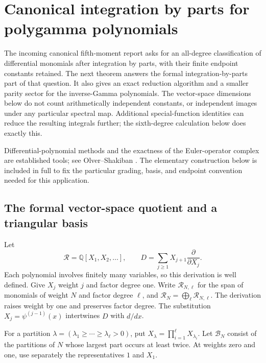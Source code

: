
\section{Canonical integration by parts for polygamma polynomials}
\label{dq:section}

The incoming canonical fifth-moment report asks for an all-degree
classification of differential monomials after integration by parts,
with their finite endpoint constants retained. The next theorem answers
the formal integration-by-parts part of that question. It also gives an
exact reduction algorithm and a smaller parity sector for the inverse-Gamma
polynomials. The vector-space dimensions below do not count arithmetically
independent constants, or independent images under any particular spectral
map. Additional special-function identities can reduce the resulting
integrals further; the sixth-degree calculation below does exactly this.

Differential-polynomial methods and the exactness of the Euler-operator
complex are established tools; see Olver--Shakiban
\cite{OlverShakiban1978}. The elementary construction below is included
in full to fix the particular grading, basis, and endpoint convention
needed for this application.

\subsection{The formal vector-space quotient and a triangular basis}

Let
\[
 \mathscr R=\mathbb Q[X_1,X_2,\ldots],\qquad
 D=\sum_{j\ge1}X_{j+1}\frac{\partial}{\partial X_j}.
\]
Each polynomial involves finitely many variables, so this derivation
is well defined. Give $X_j$ weight $j$ and factor degree one. Write
$\mathscr R_{N,\ell}$ for the span of monomials of weight $N$ and
factor degree $\ell$, and $\mathscr R_N=\bigoplus_\ell\mathscr R_{N,\ell}$.
The derivation raises weight by one and preserves factor degree.
The substitution $X_j=\psi^{(j-1)}(x)$ intertwines $D$ with $d/dx$.

For a partition $\lambda=(\lambda_1\ge\cdots\ge\lambda_\ell>0)$,
put $X_\lambda=\prod_{i=1}^\ell X_{\lambda_i}$.
Let $\mathscr B_N$ consist of the partitions of $N$ whose largest
part occurs at least twice. At weights zero and one, use separately
the representatives $1$ and $X_1$.

